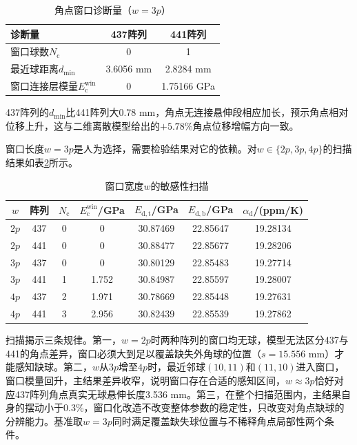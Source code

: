 \documentclass[draft,12pt,a4paper]{ctexart}
\theoremstyle{definition}
\begin{document}
\begin{table}[H]\centering
  \caption{角点窗口诊断量（$w=3p$）}\label{tab:q3-diag}
  \small
  \begin{tabular}{lcc}
    \toprule
    \textbf{诊断量} & \textbf{437阵列} & \textbf{441阵列} \\
    \midrule
    窗口球数$N_{\mathrm c}$ & 0 & 1 \\
    最近球距离$d_{\min}$ & 3.6056 mm & 2.8284 mm \\
    窗口连接层模量$E_{\mathrm c}^{\mathrm{win}}$ & 0 & 1.75166 GPa \\
    \bottomrule
  \end{tabular}
\end{table}

437阵列的$d_{\min}$比441阵列大0.78 mm，角点无连接悬伸段相应加长，预示角点相对位移上升，这与二维离散模型给出的$+5.78\%$角点位移增幅方向一致。

窗口长度$w=3p$是人为选择，需要检验结果对它的依赖。对$w\in\{2p,3p,4p\}$的扫描结果如表\ref{tab:q3-window}所示。

\begin{table}[H]\centering
  \caption{窗口宽度$w$的敏感性扫描}\label{tab:q3-window}
  \small
  \begin{tabular}{ccccccc}
    \toprule
    $w$ & 阵列 & $N_{\mathrm c}$ & $E_{\mathrm c}^{\mathrm{win}}$/GPa & $E_{\mathrm{d,t}}$/GPa & $E_{\mathrm{d,b}}$/GPa & $\alpha_{\mathrm d}$/(ppm/K) \\
    \midrule
    $2p$ & 437 & 0 & 0 & 30.87469 & 22.85647 & 19.28134 \\
    $2p$ & 441 & 0 & 0 & 30.88477 & 22.85677 & 19.28206 \\
    $3p$ & 437 & 0 & 0 & 30.80129 & 22.85483 & 19.27714 \\
    $3p$ & 441 & 1 & 1.752 & 30.84987 & 22.85597 & 19.28007 \\
    $4p$ & 437 & 2 & 1.971 & 30.78669 & 22.85448 & 19.27631 \\
    $4p$ & 441 & 3 & 2.956 & 30.82439 & 22.85539 & 19.27862 \\
    \bottomrule
  \end{tabular}
\end{table}

扫描揭示三条规律。第一，$w=2p$时两种阵列的窗口均无球，模型无法区分437与441的角点差异，窗口必须大到足以覆盖缺失外角球的位置（$s=15.556$ mm）才能感知缺球。第二，$w$从$3p$增至$4p$时，最近邻球$(10,11)$和$(11,10)$进入窗口，窗口模量回升，主结果差异收窄，说明窗口存在合适的感知区间，$w\approx3p$恰好对应437阵列角点真实无球悬伸长度3.536 mm。第三，在整个扫描范围内，主结果自身的摆动小于$0.3\%$，窗口化改造不改变整体参数的稳定性，只改变对角点缺球的分辨能力。基准取$w=3p$同时满足覆盖缺失球位置与不稀释角点局部性两个条件。
\end{document}
